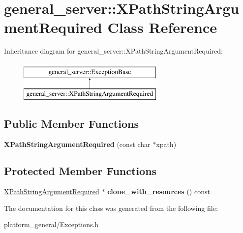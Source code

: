 \hypertarget{classgeneral__server_1_1XPathStringArgumentRequired}{\section{general\-\_\-server\-:\-:\-X\-Path\-String\-Argument\-Required \-Class \-Reference}
\label{classgeneral__server_1_1XPathStringArgumentRequired}
}
\-Inheritance diagram for general\-\_\-server\-:\-:\-X\-Path\-String\-Argument\-Required\-:\begin{figure}[H]
\begin{center}
\leavevmode
\includegraphics[height=2.000000cm]{classgeneral__server_1_1XPathStringArgumentRequired}
\end{center}
\end{figure}
\subsection*{\-Public \-Member \-Functions}
\begin{DoxyCompactItemize}
\item 
\hypertarget{classgeneral__server_1_1XPathStringArgumentRequired_ad73fff0b0fd7d195c316fc90554ac9c5}{{\bfseries \-X\-Path\-String\-Argument\-Required} (const char $\ast$xpath)}\label{classgeneral__server_1_1XPathStringArgumentRequired_ad73fff0b0fd7d195c316fc90554ac9c5}

\end{DoxyCompactItemize}
\subsection*{\-Protected \-Member \-Functions}
\begin{DoxyCompactItemize}
\item 
\hypertarget{classgeneral__server_1_1XPathStringArgumentRequired_a18585600aa7ef27167d9c0bf6e841504}{\hyperlink{classgeneral__server_1_1XPathStringArgumentRequired}{\-X\-Path\-String\-Argument\-Required} $\ast$ {\bfseries clone\-\_\-with\-\_\-resources} () const }\label{classgeneral__server_1_1XPathStringArgumentRequired_a18585600aa7ef27167d9c0bf6e841504}

\end{DoxyCompactItemize}


\-The documentation for this class was generated from the following file\-:\begin{DoxyCompactItemize}
\item 
platform\-\_\-general/\-Exceptions.\-h\end{DoxyCompactItemize}
